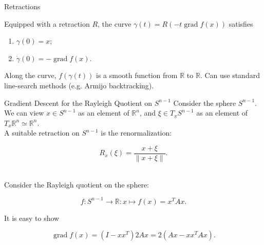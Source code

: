 \documentclass[xcolor=dvipsnames,t]{beamer} %
\newcommand{\reals}{\mathbb{R}}
\begin{document}
\begin{frame}{Retractions}
   
   Equipped with a retraction $R$, the curve $\gamma(t) = R(-t\operatorname{grad}f(x))$ satisfies
   \begin{enumerate}[1.]
      \item $\gamma(0)=x$;
      \item $\dot{\gamma}(0)=-\operatorname{grad}f(x)$.
   \end{enumerate}
     
   Along the curve, $f(\gamma(t))$ is a smooth function from $\reals$ to $\reals$.  Can use standard line-search methods (e.g. Armijo backtracking).
  
\end{frame}


\begin{frame}{Gradient Descent for the Rayleigh Quotient on $S^{n-1}$}
   Consider the sphere $S^{n-1}$.  We can view $x\in S^{n-1}$ as an element of $\reals^n$, and $\xi\in T_xS^{n-1}$ as an element of $T_x\reals^n\simeq \reals^n$.\\[.5em]

   A suitable retraction on $S^{n-1}$ is the renormalization:

   \[ R_x(\xi) = \dfrac{x+\xi}{\|x+\xi\|}. \] 
   
   ~\\
   Consider the Rayleigh quotient on the sphere:
   
   \[ f:S^{n-1}\to \reals: x\mapsto f(x) =x^TAx. \] 

   It is easy to show
   
   \[ \operatorname{grad}f(x)=(I-xx^T)2Ax = 2(Ax-xx^TAx). \] 

\end{frame}
\end{document}
